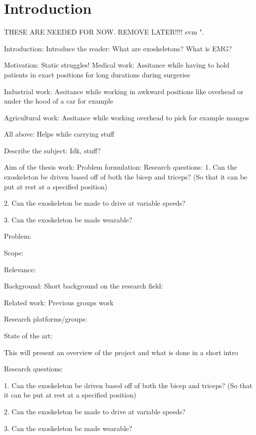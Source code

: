 \section{Introduction}
\label{section:intro}

THESE ARE NEEDED FOR NOW. REMOVE LATER!!!! \cite{IEEEtran, IEEEtranformatexample, webpage, FundConDep, exampleofjournalarticle, exampleofconferencepaper}
\ac{svm} \cite{exampleofconferencepaper}".

Introduction:
    Introduce the reader:
        What are exoskeletons?
        What is EMG?

    Motivation:
        Static struggles!
            Medical work:
                Assitance while having to hold patients in exact positions for long durations during surgeries

            Industrial work:
                Assitance while working in awkward positions like overhead or under the hood of a car for example

            Agricultural work:
                Assitance while working overhead to pick for example mangos
            
            All above:
                Helps while carrying stuff

    Describe the subject:
        Idk, stuff?

    Aim of the thesis work:
        Problem formulation: %
            Research questions:
                1.	Can the exoskeleton be driven based off of both the bicep and triceps? (So that it can be put at rest at a specified position)

                2.	Can the exoskeleton be made to drive at variable speeds?

                3.	Can the exoskeleton be made wearable?

            Problem:
                

            Scope:
            
            Relevance: %


Background: 
    Short background on the research field:

    Related work:
        Previous groups work

    Research platforms/groups:

    State of the art:


    This will present an overview of the project and what is done in a short intro


Research questions:

1.	Can the exoskeleton be driven based off of both the bicep and triceps? (So that it can be put at rest at a specified position)

2.	Can the exoskeleton be made to drive at variable speeds?

3.	Can the exoskeleton be made wearable?

